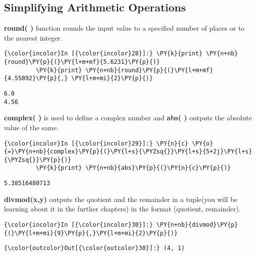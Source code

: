     \subsection{Simplifying Arithmetic
Operations}\label{simplifying-arithmetic-operations}

    \textbf{round( )} function rounds the input value to a specified number
of places or to the nearest integer.

    \begin{Verbatim}[commandchars=\\\{\}]
{\color{incolor}In [{\color{incolor}28}]:} \PY{k}{print} \PY{n+nb}{round}\PY{p}{(}\PY{l+m+mf}{5.6231}\PY{p}{)} 
         \PY{k}{print} \PY{n+nb}{round}\PY{p}{(}\PY{l+m+mf}{4.55892}\PY{p}{,} \PY{l+m+mi}{2}\PY{p}{)}
\end{Verbatim}

    \begin{Verbatim}[commandchars=\\\{\}]
6.0
4.56
    \end{Verbatim}

    \textbf{complex( )} is used to define a complex number and \textbf{abs(
)} outputs the absolute value of the same.

    \begin{Verbatim}[commandchars=\\\{\}]
{\color{incolor}In [{\color{incolor}29}]:} \PY{n}{c} \PY{o}{=}\PY{n+nb}{complex}\PY{p}{(}\PY{l+s}{\PYZsq{}}\PY{l+s}{5+2j}\PY{l+s}{\PYZsq{}}\PY{p}{)}
         \PY{k}{print} \PY{n+nb}{abs}\PY{p}{(}\PY{n}{c}\PY{p}{)}
\end{Verbatim}

    \begin{Verbatim}[commandchars=\\\{\}]
5.38516480713
    \end{Verbatim}

    \textbf{divmod(x,y)} outputs the quotient and the remainder in a
tuple(you will be learning about it in the further chapters) in the
format (quotient, remainder).

    \begin{Verbatim}[commandchars=\\\{\}]
{\color{incolor}In [{\color{incolor}30}]:} \PY{n+nb}{divmod}\PY{p}{(}\PY{l+m+mi}{9}\PY{p}{,}\PY{l+m+mi}{2}\PY{p}{)}
\end{Verbatim}

            \begin{Verbatim}[commandchars=\\\{\}]
{\color{outcolor}Out[{\color{outcolor}30}]:} (4, 1)
\end{Verbatim}
        
